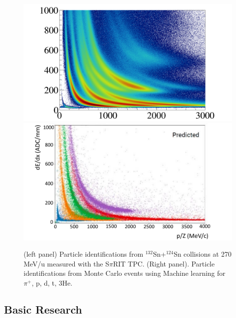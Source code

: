 \documentclass[%
10pt]{article}
\begin{document}
\begin{figure}[htb!]
\centering
\includegraphics[width=0.49\linewidth]{figures/pid_sTPC_data.pdf}
\includegraphics[width=0.49\linewidth]{figures/pid_sTPC_monte_carlo.pdf}
\caption{
(left panel) Particle identifications from $^{132}$Sn+$^{124}$Sn collisions at 270 MeV/u measured with the S$\pi$RIT TPC. (Right panel). Particle identifications from Monte Carlo events using Machine learning for $\pi^+$, p, d, t, 3He.
}
\end{figure}
\clearpage
\newpage


\subsection{Basic Research}
\end{document}
